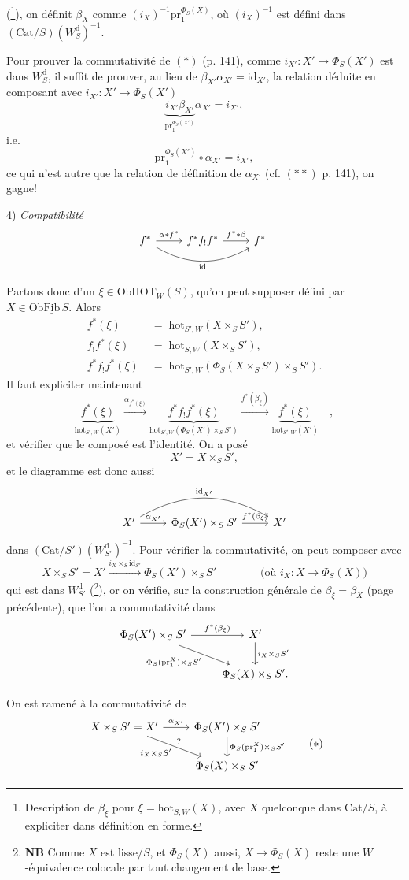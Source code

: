 \documentclass[11pt]{article}
\newcommand{\printedpage}[1]{\marginpar{\footnotesize p.~#1}}
\newcommand{\msp}[1]{\marginpar{\footnotesize [#1]}}
\newcommand{\HOT}{\mathrm{HOT}}
\newcommand{\Cat}{\mathrm{Cat}}
\newcommand{\Ob}{\mathrm{Ob}}
\newcommand{\id}{\mathrm{id}}
\newcommand{\hot}{\mathrm{hot}}
\newcommand{\pr}{\mathrm{pr}}
\newcommand{\Wd}{W^{\mathrm{d}}}
\begin{document}
(\footnote[70]{Description de $\beta_\xi$ pour $\xi=\hot_{S,W}(X)$, avec $X$ quelconque dans $\Cat/S$, à expliciter dans définition en forme.}), on définit $\beta_X$ comme $(i_X)^{-1}\pr_1^{\Phi_S(X)}$, où $(i_X)^{-1}$ est défini dans $(\Cat/S)(\Wd_S)^{-1}$.

Pour prouver la commutativité de $(*)$ (p. 141), comme $i_{X'} : X'\longrightarrow\Phi_S(X')$ est dans $\Wd_S$, il suffit de prouver, au lieu de $\beta_{X'}\alpha_{X'} = \id_{X'}$, la relation déduite en composant avec $i_{X'} : X'\longrightarrow\Phi_S(X')$
\[
\underbrace{i_{X'}\beta_{X'}}_{\pr_1^{\Phi_S(X')}}\alpha_{X'} = i_{X'},
\]
i.e.
\[
\pr_1^{\Phi_S(X')}\circ\alpha_{X'} = i_{X'},
\]
ce qui n'est autre que la relation de définition de $\alpha_{X'}$ (cf. $(**)$ p. 141), on gagne!

4) \textit{Compatibilité}
\[
\begin{tikzcd}
f^* \arrow[r, "\alpha*f^*"] \arrow[rr, bend right, "\id"'] & f^*f_!f^* \arrow[r, "f^**\beta"] & f^*.
\end{tikzcd}
\]

\printedpage{88}
\leavevmode\msp{page 144}Partons donc d'un $\xi\in\Ob\HOT_W(S)$, qu'on peut supposer défini par $X\in\Ob\underline{\mathrm{Fib}}\,S$. Alors
\[
\begin{aligned}
f^*(\xi) &\;=\; \hot_{S',W}(X\times_S S'),\\
f_!f^*(\xi) &\;=\; \hot_{S,W}(X\times_S S'),\\
f^*f_!f^*(\xi) &\;=\; \hot_{S',W}(\Phi_S(X\times_S S')\times_S S').
\end{aligned}
\]
Il faut expliciter maintenant
\[
\underbrace{f^*(\xi)}_{\hot_{S',W}(X')} \xrightarrow{\alpha_{f^*(\xi)}} \underbrace{f^*f_!f^*(\xi)}_{\hot_{S',W}(\Phi_S(X')\times_S S')} \xrightarrow{f^*(\beta_\xi)} \underbrace{f^*(\xi)}_{\hot_{S',W}(X')} \quad ,
\]
et vérifier que le composé est l'identité. On a posé
\[
X' = X\times_S S',
\]
et le diagramme est donc aussi
\[
\begin{tikzcd}
X' \arrow[r, "{\alpha_{X'}}"] \arrow[rr, bend left, "{\id_{X'}}"] & \Phi_S(X')\times_S S' \arrow[r, "f^*(\beta_\xi)"] & X' %
\end{tikzcd}
\]
dans $(\Cat/S')(\Wd_{S'})^{-1}$. Pour vérifier la commutativité, on peut composer avec
\[
X\times_S S' = X' \xrightarrow{i_X\times_S\id_{S'}} \Phi_S(X')\times_S S' \qquad\qquad \text{(où } i_X : X\longrightarrow\Phi_S(X)\text{)}
\]
qui est dans $\Wd_{S'}$ (\footnote[71]{\textbf{NB} Comme $X$ est lisse$/S$, et $\Phi_S(X)$ aussi, $X\longrightarrow\Phi_S(X)$ reste une $W$-équivalence colocale par tout changement de base.}), or on vérifie, sur la construction générale de $\beta_\xi=\beta_X$ (page précédente), que l'on a commutativité dans
\[
\begin{tikzcd}
\Phi_S(X')\times_S S' \arrow[r, "f^*(\beta_\xi)"] \arrow[dr, "\Phi_S(\pr_1^X)\times_S S'"'] & X' \arrow[d, "i_X\times_S S'"] \\
 & \Phi_S(X)\times_S S'.
\end{tikzcd}
\]

\leavevmode\msp{page 145}On est ramené à la commutativité de
\[
\begin{tikzcd}
X\times_S S' = X' \arrow[r, "{\alpha_{X'}}"] \arrow[dr, "i_X\times_S S'"', "?"] & \Phi_S(X')\times_S S' \arrow[d, "\Phi_S(\pr_1^X)\times_S S'"] \\
 & \Phi_S(X)\times_S S'
\end{tikzcd}
\tag*{$(*)$}
\]
\end{document}
